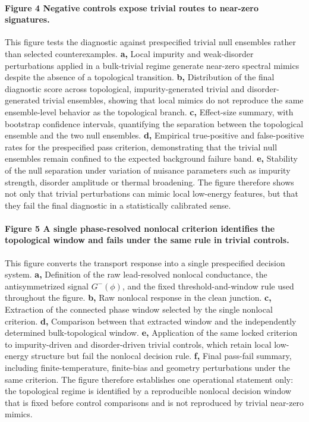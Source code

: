 \paragraph{Figure 4 \textbar{} Negative controls expose trivial routes to near-zero signatures.}
This figure tests the diagnostic against prespecified trivial null ensembles rather than selected counterexamples. \textbf{a,} Local impurity and weak-disorder perturbations applied in a bulk-trivial regime generate near-zero spectral mimics despite the absence of a topological transition. \textbf{b,} Distribution of the final diagnostic score across topological, impurity-generated trivial and disorder-generated trivial ensembles, showing that local mimics do not reproduce the same ensemble-level behavior as the topological branch. \textbf{c,} Effect-size summary, with bootstrap confidence intervals, quantifying the separation between the topological ensemble and the two null ensembles. \textbf{d,} Empirical true-positive and false-positive rates for the prespecified pass criterion, demonstrating that the trivial null ensembles remain confined to the expected background failure band. \textbf{e,} Stability of the null separation under variation of nuisance parameters such as impurity strength, disorder amplitude or thermal broadening. The figure therefore shows not only that trivial perturbations can mimic local low-energy features, but that they fail the final diagnostic in a statistically calibrated sense.

\paragraph{Figure 5 \textbar{} A single phase-resolved nonlocal criterion identifies the topological window and fails under the same rule in trivial controls.}
This figure converts the transport response into a single prespecified decision system. \textbf{a,} Definition of the raw lead-resolved nonlocal conductance, the antisymmetrized signal $G^{-}(\phi)$, and the fixed threshold-and-window rule used throughout the figure. \textbf{b,} Raw nonlocal response in the clean junction. \textbf{c,} Extraction of the connected phase window selected by the single nonlocal criterion. \textbf{d,} Comparison between that extracted window and the independently determined bulk-topological window. \textbf{e,} Application of the same locked criterion to impurity-driven and disorder-driven trivial controls, which retain local low-energy structure but fail the nonlocal decision rule. \textbf{f,} Final pass-fail summary, including finite-temperature, finite-bias and geometry perturbations under the same criterion. The figure therefore establishes one operational statement only: the topological regime is identified by a reproducible nonlocal decision window that is fixed before control comparisons and is not reproduced by trivial near-zero mimics.

